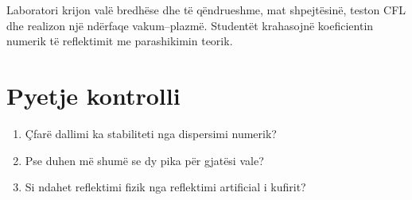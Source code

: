 \begin{lidhje}
Laboratori krijon valë bredhëse dhe të qëndrueshme, mat shpejtësinë, teston CFL dhe realizon një ndërfaqe vakum--plazmë. Studentët krahasojnë koeficientin numerik të reflektimit me parashikimin teorik.
\end{lidhje}

\section*{Pyetje kontrolli}
\begin{enumerate}
\item Çfarë dallimi ka stabiliteti nga dispersimi numerik?
\item Pse duhen më shumë se dy pika për gjatësi vale?
\item Si ndahet reflektimi fizik nga reflektimi artificial i kufirit?
\end{enumerate}



